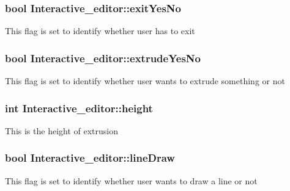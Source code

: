 \subsubsection[{\texorpdfstring{exit\+Yes\+No}{exitYesNo}}]{\setlength{\rightskip}{0pt plus 5cm}bool Interactive\+\_\+editor\+::exit\+Yes\+No}\hypertarget{classInteractive__editor_a66468db06170aca0dae8e057d98253bd}{}\label{classInteractive__editor_a66468db06170aca0dae8e057d98253bd}
This flag is set to identify whether user has to exit 
\subsubsection[{\texorpdfstring{extrude\+Yes\+No}{extrudeYesNo}}]{\setlength{\rightskip}{0pt plus 5cm}bool Interactive\+\_\+editor\+::extrude\+Yes\+No}\hypertarget{classInteractive__editor_a1688fc65949d3d4c337b7b4e36986f3c}{}\label{classInteractive__editor_a1688fc65949d3d4c337b7b4e36986f3c}
This flag is set to identify whether user wants to extrude something or not 
\subsubsection[{\texorpdfstring{height}{height}}]{\setlength{\rightskip}{0pt plus 5cm}int Interactive\+\_\+editor\+::height}\hypertarget{classInteractive__editor_aced5ec777fe62fb280f3668a1c59f9b7}{}\label{classInteractive__editor_aced5ec777fe62fb280f3668a1c59f9b7}
This is the height of extrusion 
\subsubsection[{\texorpdfstring{line\+Draw}{lineDraw}}]{\setlength{\rightskip}{0pt plus 5cm}bool Interactive\+\_\+editor\+::line\+Draw}\hypertarget{classInteractive__editor_aa0de8abac09ce2259252fba6c1958e83}{}\label{classInteractive__editor_aa0de8abac09ce2259252fba6c1958e83}
This flag is set to identify whether user wants to draw a line or not 
